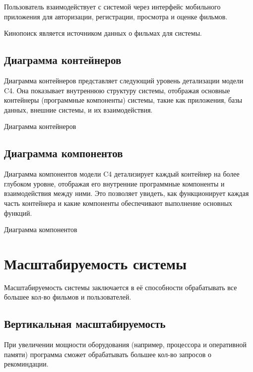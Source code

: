 Пользователь взаимодействует с системой через интерфейс мобильного приложения для авторизации, регистрации, просмотра и
оценке фильмов.\par
Кинопоиск является источником данных о фильмах для системы.
\clearpage

\subsection{Диаграмма контейнеров}

Диаграмма контейнеров представляет следующий уровень детализации модели C4.
Она показывает внутреннюю структуру системы,
отображая основные контейнеры (программные компоненты) системы,
такие как приложения, базы данных, внешние системы, и их взаимодействия.

\begin{image}
    \caption{Диаграмма контейнеров}
    \label{fig:c4:container}
\end{image}


\subsection{Диаграмма компонентов}

Диаграмма компонентов модели C4 детализирует
каждый контейнер на более глубоком уровне,
отображая его внутренние программные компоненты и взаимодействия между ними.
Это позволяет увидеть, как функционирует каждая часть контейнера
и какие компоненты обеспечивают выполнение основных функций.

\begin{image}
    \caption{Диаграмма компонентов}
    \label{fig:c4:components}
\end{image}


\section{Масштабируемость системы}

Масштабируемость системы заключается в её способности обрабатывать все большее кол-во фильмов и пользователей.

\subsection{Вертикальная масштабируемость}

При увеличении мощности оборудования
(например, процессора и оперативной памяти)
программа сможет обрабатывать большее кол-во запросов о рекоминдации.

